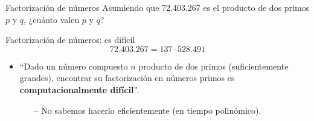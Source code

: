 \documentclass[10pt]{beamer} %
\begin{document}
\begin{frame}{Factorización de números}
    Asumiendo que 72.403.267 es el producto de dos primos $p$ y $q$, ¿cuánto valen $p$ y $q$?
\end{frame}
\begin{frame}{Factorización de números: es difícil}
\[72.403.267 = 137 \cdot 528.491\]\par
\begin{itemize}
    \item ``Dado un número compuesto $n$ producto de dos primos (suficientemente grandes), encontrar su factorización en números primos es \textbf{computacionalmente difícil}''.
    \begin{itemize}
        \item[--] No sabemos hacerlo eficientemente (en tiempo polinómico).
    \end{itemize}
\end{itemize}
\end{frame}
\end{document}
